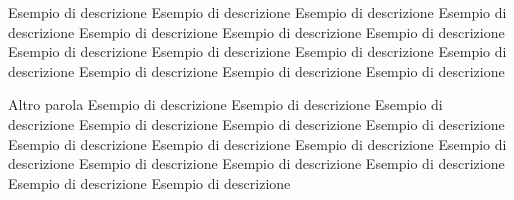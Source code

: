 

{Esempio di descrizione Esempio di descrizione Esempio di descrizione Esempio di descrizione Esempio di descrizione Esempio di descrizione Esempio di descrizione Esempio di descrizione Esempio di descrizione Esempio di descrizione Esempio di descrizione Esempio di descrizione Esempio di descrizione Esempio di descrizione } 

{Altro parola Esempio di descrizione Esempio di descrizione Esempio di descrizione Esempio di descrizione Esempio di descrizione Esempio di descrizione Esempio di descrizione Esempio di descrizione Esempio di descrizione Esempio di descrizione Esempio di descrizione Esempio di descrizione Esempio di descrizione Esempio di descrizione Esempio di descrizione  }